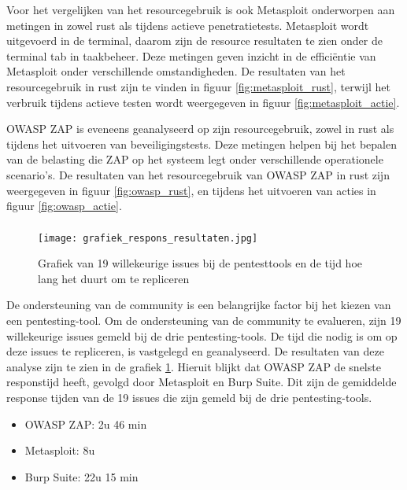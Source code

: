 Voor het vergelijken van het resourcegebruik is ook Metasploit onderworpen aan metingen in zowel rust als tijdens actieve 
penetratietests. Metasploit wordt uitgevoerd in de terminal, daarom zijn de resource resultaten te zien onder de terminal tab 
in taakbeheer. Deze metingen geven inzicht in de efficiëntie van Metasploit onder verschillende omstandigheden. De 
resultaten van het resourcegebruik in rust zijn te vinden in figuur \ref{fig:metasploit_rust}, terwijl het verbruik tijdens 
actieve testen wordt weergegeven in figuur \ref{fig:metasploit_actie}.

OWASP ZAP is eveneens geanalyseerd op zijn resourcegebruik, zowel in rust als tijdens het uitvoeren van beveiligingstests. 
Deze metingen helpen bij het bepalen van de belasting die ZAP op het systeem legt onder verschillende operationele scenario's. 
De resultaten van het resourcegebruik van OWASP ZAP in rust zijn weergegeven in figuur \ref{fig:owasp_rust}, en tijdens het 
uitvoeren van acties in figuur \ref{fig:owasp_actie}.

\subsubsection{}
\begin{figure}
    \centering
    \texttt{[image: grafiek\_respons\_resultaten.jpg]}
    \caption[Grafiek van 19 willekeurige issues bij de pentesttools en de tijd hoe lang het duurt om te repliceren]{Grafiek van 19 willekeurige issues bij de pentesttools en de tijd hoe lang het duurt om te repliceren}
    \label{fig:respons_grafiek}
\end{figure}
De ondersteuning van de community is een belangrijke factor bij het kiezen van een pentesting-tool. Om de ondersteuning van
de community te evalueren, zijn 19 willekeurige issues gemeld bij de drie pentesting-tools. De tijd die nodig is om op deze
issues te repliceren, is vastgelegd en geanalyseerd. De resultaten van deze analyse zijn te zien in de
grafiek \ref{fig:respons_grafiek}. Hieruit blijkt dat OWASP ZAP de snelste responstijd heeft, gevolgd door Metasploit en
Burp Suite. Dit zijn de gemiddelde response tijden van de 19 issues die zijn gemeld bij de drie pentesting-tools.
\begin{itemize}
    \item OWASP ZAP: 2u 46 min
    \item Metasploit: 8u
    \item Burp Suite: 22u 15 min
\end{itemize}

